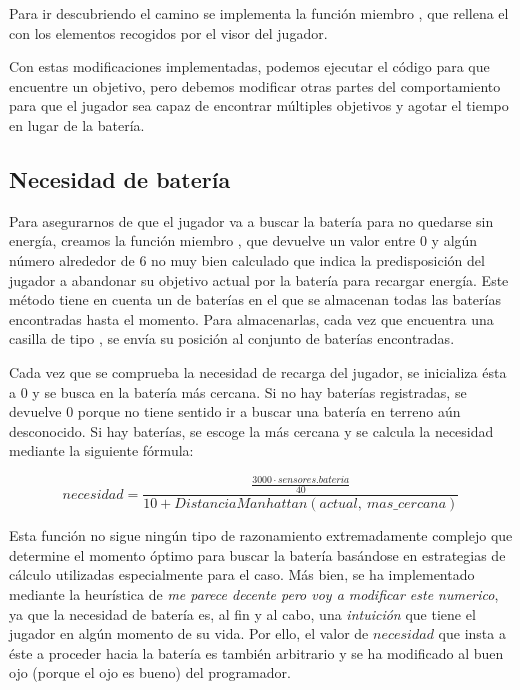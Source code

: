 Para ir descubriendo el camino se implementa la función miembro , que rellena el  con los elementos recogidos por el visor del jugador.

Con estas modificaciones implementadas, podemos ejecutar el código para que encuentre un objetivo, pero debemos modificar otras partes del comportamiento para que el jugador sea capaz de encontrar múltiples objetivos y agotar el tiempo en lugar de la batería.

\subsection{Necesidad de batería}\label{belkan-bateria}

Para asegurarnos de que el jugador va a buscar la batería para no quedarse sin energía, creamos la función miembro , que devuelve un valor entre $0$ y algún número alrededor de $6$ no muy bien calculado que indica la predisposición del jugador a abandonar su objetivo actual por la batería para recargar energía.
Este método tiene en cuenta un  de baterías en el que se almacenan todas las baterías encontradas hasta el momento.
Para almacenarlas, cada vez que  encuentra una casilla de tipo , se envía su posición al conjunto de baterías encontradas.

Cada vez que se comprueba la necesidad de recarga del jugador, se inicializa ésta a $0$ y se busca en la batería más cercana.
Si no hay baterías registradas, se devuelve $0$ porque no tiene sentido ir a buscar una batería en terreno aún desconocido.
Si hay baterías, se escoge la más cercana y se calcula la necesidad mediante la siguiente fórmula:

\[necesidad = \frac{\frac{3000\cdot sensores.bateria}{40}}{10+DistanciaManhattan(actual,\ mas\_cercana)}\]

Esta función no sigue ningún tipo de razonamiento extremadamente complejo que determine el momento óptimo para buscar la batería basándose en estrategias de cálculo utilizadas especialmente para el caso.
Más bien, se ha implementado mediante la heurística de \textit{me parece decente pero voy a modificar este numerico}, ya que la necesidad de batería es, al fin y al cabo, una \textit{intuición} que tiene el jugador en algún momento de su vida.
Por ello, el valor de $necesidad$ que insta a éste a proceder hacia la batería es también arbitrario y se ha modificado al buen ojo (porque el ojo es bueno) del programador.

